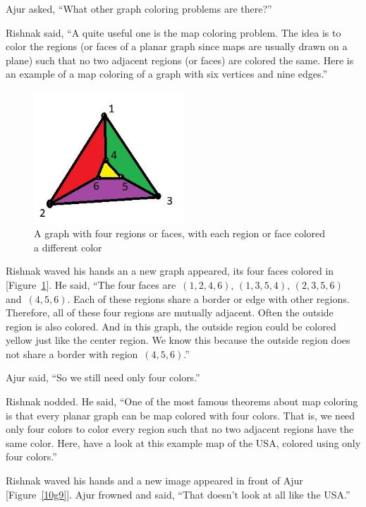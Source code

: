 Ajur asked, ``What other graph coloring problems are there?''

Rishnak said, ``A quite useful one is the map coloring problem. The idea is to color the regions (or faces of a planar graph since maps are usually drawn on a plane) such that no two adjacent regions (or faces) are colored the same. Here is an example of a map coloring of a graph with six vertices and nine edges.''

\begin{figure}
\begin{center}
\includegraphics[width=0.5\textwidth]{mapcolor.JPG}
\caption{A graph with four regions or faces, with each region or face colored a different color}\label{10g8}
\end{center}
\end{figure}

Rishnak waved his hands an a new graph appeared, its four faces colored in [Figure~\ref{10g8}]. He said, ``The four faces are~$(1,2,4,6)$, $(1,3,5,4)$, $(2,3,5,6)$ and~$(4,5,6)$. Each of these regions share a border or edge with other regions. Therefore, all of these four regions are mutually adjacent. Often the outside region is also colored. And in this graph, the outside region could be colored yellow just like the center region. We know this because the outside region does not share a border with region~$(4,5,6)$.''

Ajur said, ``So we still need only four colors.''

Rishnak nodded. He said, ``One of the most famous theorems about map coloring is that every planar graph can be map colored with four colors. That is, we need only four colors to color every region such that no two adjacent regions have the same color. Here, have a look at this example map of the USA, colored using only four colors.''

Rishnak waved his hands and a new image appeared in front of Ajur [Figure~\ref{10g9}]. Ajur frowned and said, ``That doesn't look at all like the USA.''

